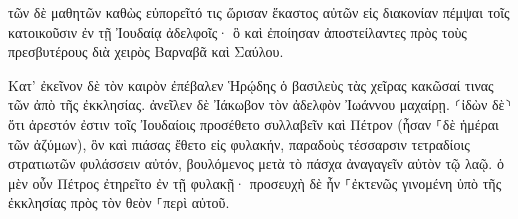 \documentclass{openreader}
\begin{document}
τῶν δὲ μαθητῶν καθὼς εὐπορεῖτό τις ὥρισαν ἕκαστος αὐτῶν εἰς διακονίαν πέμψαι τοῖς κατοικοῦσιν ἐν τῇ Ἰουδαίᾳ ἀδελφοῖς· 
ὃ καὶ ἐποίησαν ἀποστείλαντες πρὸς τοὺς πρεσβυτέρους διὰ χειρὸς Βαρναβᾶ καὶ Σαύλου. 

Κατ’ ἐκεῖνον δὲ τὸν καιρὸν ἐπέβαλεν Ἡρῴδης ὁ βασιλεὺς τὰς χεῖρας κακῶσαί τινας τῶν ἀπὸ τῆς ἐκκλησίας. 
ἀνεῖλεν δὲ Ἰάκωβον τὸν ἀδελφὸν Ἰωάννου μαχαίρῃ. 
⸂ἰδὼν δὲ⸃ ὅτι ἀρεστόν ἐστιν τοῖς Ἰουδαίοις προσέθετο συλλαβεῖν καὶ Πέτρον (ἦσαν ⸀δὲ ἡμέραι τῶν ἀζύμων), 
ὃν καὶ πιάσας ἔθετο εἰς φυλακήν, παραδοὺς τέσσαρσιν τετραδίοις στρατιωτῶν φυλάσσειν αὐτόν, βουλόμενος μετὰ τὸ πάσχα ἀναγαγεῖν αὐτὸν τῷ λαῷ. 
ὁ μὲν οὖν Πέτρος ἐτηρεῖτο ἐν τῇ φυλακῇ· προσευχὴ δὲ ἦν ⸀ἐκτενῶς γινομένη ὑπὸ τῆς ἐκκλησίας πρὸς τὸν θεὸν ⸀περὶ αὐτοῦ. 
\end{document}
